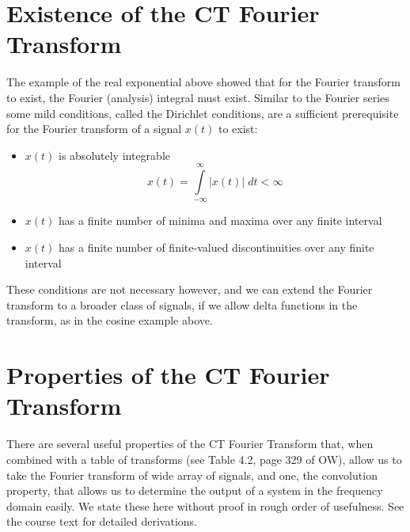 \section{Existence of the CT Fourier Transform}

The example of the real exponential above showed that for the Fourier transform to exist, the Fourier (analysis) integral must exist. Similar to the Fourier series some mild conditions, called the Dirichlet conditions, are a sufficient prerequisite for the Fourier transform of a signal $x(t)$ to exist:
\begin{itemize}
\item $x(t)$ is absolutely integrable
  \[
  x(t) = \int\limits_{-\infty}^{\infty} |x(t)|\; dt < \infty
  \]
\item $x(t)$ has a finite number of minima and maxima over any finite interval
\item $x(t)$ has a finite number of finite-valued discontinuities over any finite interval
\end{itemize}

These conditions are not necessary however, and we can extend the Fourier transform to a broader class of signals, if we allow delta functions in the transform, as in the cosine example above. 

\section{Properties of the CT Fourier Transform}

There are several useful properties of the CT Fourier Transform that, when combined with a table of transforms (see Table 4.2, page 329 of OW), allow us to take the Fourier transform of  wide array of signals, and one, the convolution property, that allows us to determine the output of a system in the frequency domain easily. We state these here without proof in rough order of usefulness. See the course text for detailed derivations.

